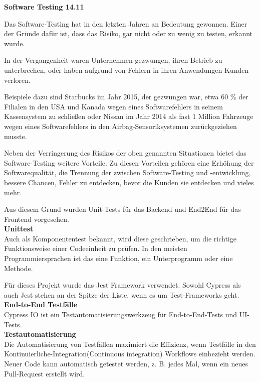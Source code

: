 \textbf{Software Testing 14.11}

Das Software-Testing hat in den letzten Jahren an Bedeutung gewonnen. 
Einer der Gründe dafür ist, dass das Risiko, gar nicht oder zu wenig zu testen, erkannt wurde.

In der Vergangenheit waren Unternehmen gezwungen, ihren Betrieb zu unterbrechen, oder haben aufgrund von Fehlern in ihren Anwendungen Kunden verloren. 

Beispiele dazu sind Starbucks im Jahr 2015, der gezwungen war, etwa 60 \% der Filialen in den USA und Kanada wegen eines Softwarefehlers in seinem Kassensystem zu schließen{\cite{QS1}} oder Nissan im Jahr 2014 als fast 1 Million Fahrzeuge wegen eines Softwarefehlers in den Airbag-Sensoriksystemen zurückgeziehen musste{\cite{QS2}}. 

Neben der Verringerung des Risikos der oben genannten Situationen bietet das Software-Testing weitere Vorteile. 
Zu diesen Vorteilen gehören eine Erhöhung der Softwarequalität, die 
Trennung der zwischen Software-Testing und -entwicklung, bessere Chancen, Fehler zu entdecken, bevor die Kunden sie entdecken und vieles mehr.

Aus diesem Grund wurden Unit-Tests für das Backend und End2End für das Frontend vorgesehen. 
\\

\textbf{Unittest}\\
Auch als Komponententest bekannt, wird diese geschrieben, um die richtige Funktionsweise einer Codeeinheit zu prüfen. In den meisten Programmiersprachen ist das eine Funktion, ein Unterprogramm oder eine Methode.

Für dieses Projekt wurde das Jest Framework verwendet. 
Sowohl Cypress als auch Jest stehen an der Spitze der Liste, wenn es um Test-Frameworks geht{\cite{QS3}}.
\\
\textbf{End-to-End Testfälle}\\
Cypress IO ist ein Testautomatisierungswerkzeug für End-to-End-Tests und UI-Tests. 
\\
\textbf{Testautomatisierung}\\
Die Automatisierung von Testfällen maximiert die Effizienz, wenn Testfälle in den Kontinuierliche-Integration(Continuous integration) Workflows einbezieht werden. Neuer Code kann automatisch getestet werden, z. B. jedes Mal, wenn ein neues Pull-Request erstellt wird.

